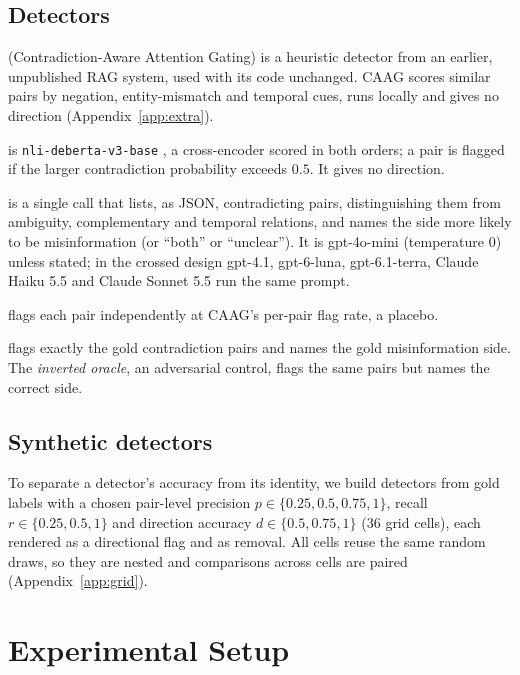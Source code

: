 \subsection{Detectors}
\label{sec:detectors}
\begin{description}[leftmargin=0pt,itemsep=1pt,topsep=2pt]
\item[CAAG] (Contradiction-Aware Attention Gating) is a heuristic detector from an earlier, unpublished RAG system,
used with its code unchanged. CAAG scores similar pairs by negation, entity-mismatch and temporal cues, runs locally
and gives no direction (Appendix~\ref{app:extra}).
\item[NLI] is \texttt{nli-deberta-v3-base} \citep{he2023debertav3}, a cross-encoder scored in both orders; a pair is
flagged if the larger contradiction probability exceeds $0.5$. It gives no direction.
\item[LLM] is a single call that lists, as JSON, contradicting pairs, distinguishing them from ambiguity, complementary and
temporal relations, and names the side more likely to be misinformation (or ``both'' or ``unclear''). It is
gpt-4o-mini (temperature 0) unless stated; in the crossed design gpt-4.1, gpt-6-luna, gpt-6.1-terra, Claude Haiku 5.5
and Claude Sonnet 5.5 run the same prompt.
\item[Random] flags each pair independently at CAAG's per-pair flag rate, a placebo.
\item[Oracle] flags exactly the gold contradiction pairs and names the gold misinformation side. The
\emph{inverted oracle}, an adversarial control, flags the same pairs but names the correct side.
\end{description}

\subsection{Synthetic detectors}
\label{sec:synthetic}
To separate a detector's accuracy from its identity, we build detectors from gold labels with a chosen pair-level
precision $p\in\{0.25,0.5,0.75,1\}$, recall $r\in\{0.25,0.5,1\}$ and direction accuracy $d\in\{0.5,0.75,1\}$ (36
grid cells), each rendered as a directional flag and as removal. All cells reuse the same random draws, so they are nested
and comparisons across cells are paired (Appendix~\ref{app:grid}).
\section{Experimental Setup}
\label{sec:setup}

